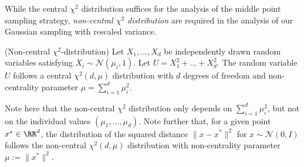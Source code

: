 \begin{subappendices}
While the central $\chi^2$ distribution suffices for the analysis of the middle point sampling strategy, \textit{non-central $\chi^2$ distribution} are required in the analysis of our Gaussian sampling with rescaled variance.
\begin{definition}{(Non-central $\chi^2$-distribution)}
Let $X_1,...,X_d$ be independently drawn random variables satisfying $X_i \sim \mathcal{N}(\mu_i,1)$. 
Let $U = X_1^2+...+X_d^2$. 
The random variable $U$ follows a central $\chi^2(d,\mu)$ distribution with $d$ degrees of freedom and non-centrality parameter $\mu=\sum_{i=1}^d \mu_i^2$.
\end{definition}
Note here that the non-central $\chi^2$ distribution only depends on $\sum_{i=1}^d \mu_i^2$, but not on the individual values $(\mu_1,...,\mu_d)$. 
Note further that, for a given point $x^* \in \RR^d$, the distribution of the squared distance $\lVert x - x^*\rVert^2$ for $x \sim \mathcal{N}(0,I)$ follows the non-central $\chi^2(d,\mu)$ distribution with non-centrality parameter $\mu:=\lVert x^*\rVert^2$.


\end{subappendices}
